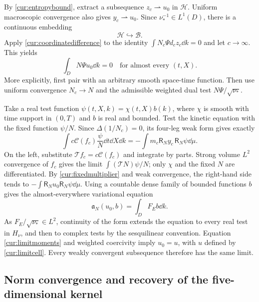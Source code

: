 By \eqref{cur:entropybound}, extract a subsequence
$z_c\rightharpoonup u_0$ in $\mathcal H$.
Uniform macroscopic convergence also gives $y_c\rightharpoonup u_0$.
Since $\nu_*^{-1}\in L^1(D)$, there is a continuous embedding
\begin{equation}\label{cur:weighteddual}
 \mathcal H\hookrightarrow\mathcal B.
\end{equation}
Apply \eqref{cur:coordinatedifference} to the identity
$\int N_c\Psi d_cz_c\dd k=0$ and let $c\to\infty$. This yields
\begin{equation}\label{cur:limitmoments}
 \int_D N\Psi u_0\dd k=0\quad\text{for almost every }(t,X).
\end{equation}
More explicitly, first pair with an arbitrary smooth space-time function.
Then use uniform convergence $N_c\to N$ and the admissible weighted
dual test $N\Psi/\sqrt{\nu_*}$.

Take a real test function $\psi(t,X,k)=\chi(t,X)b(k)$, where $\chi$
is smooth with time support in $(0,T)$ and $b$ is real and bounded.
Test the kinetic equation with the fixed function $\psi/N$.
Since $\Delta(1/N_c)=0$, its four-leg weak form gives exactly
\begin{equation}\label{cur:weakidentity}
 \int c\mathcal C(f_c)\frac\psi N\dd t\dd X\dd k
           =-\int m_c\mathsf R_Ny_c\,\mathsf R_N\psi\dd\mu.
\end{equation}
On the left, substitute $\mathcal Tf_c=c\mathcal C(f_c)$ and integrate
by parts. Strong volume $L^2$ convergence of $f_c$ gives the limit
$\int(\mathcal TN)\psi/N$; only $\chi$ and the fixed $N$ are differentiated.
By \eqref{cur:fixedmultiplier} and weak convergence, the right-hand side
tends to $-\int\mathsf R_Nu_0\mathsf R_N\psi\dd\mu$.
Using a countable dense family of bounded functions $b$ gives the
almost-everywhere variational equation
\[
 \mathfrak a_N(u_0,b)=\int_DF_Eb\dd k.
\]
As $F_E/\sqrt{\nu_*}\in L^2$, continuity of the form extends the equation
to every real test in $H_\nu$, and then to complex tests by the
sesquilinear convention. Equation \eqref{cur:limitmoments} and weighted
coercivity imply $u_0=u$, with $u$ defined by \eqref{cur:limitcell}.
Every weakly convergent subsequence therefore has the same limit.

\subsection{Norm convergence and recovery of the five-dimensional kernel}

